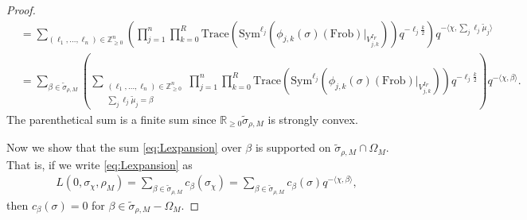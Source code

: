 \documentclass[10pt]{amsart}
\theoremstyle{definition}
\numberwithin{equation}{section}
\DeclareMathOperator{\Hom}{\mathrm{Hom}}
\numberwithin{equation}{subsection}
\newcommand{\ZZ}{\mathbb{Z}}
\newcommand{\RR}{\mathbb{R}}
\newcommand{\CC}{\mathbb{C}}
\begin{document}
\begin{proof}
\begin{align}
    \nonumber &=\sum_{(\ell_1,\ldots,\ell_n)\in\mathbb{Z}_{\geq 0}^n}\left(\prod_{j=1}^n\prod_{k=0}^R \mathrm{Trace}\left(\mathrm{Sym}^{\ell_j}\left(\phi_{j,k}(\sigma)(\mathrm{Frob})\big|_{V_{j,k}^{I_F}}\right)\right)q^{-\ell_j\frac{k}{2}}\right)q^{- \langle\chi,\sum_j\ell_j\widetilde{\mu}_j\rangle}\\
    &=\sum_{\beta\in \widetilde{\sigma}_{\rho,M}} \left(\sum_{\substack{(\ell_1,\ldots,\ell_n)\in\mathbb{Z}_{\geq 0}^n\\
    \sum_j\ell_j\widetilde{\mu}_j = \beta}} \prod_{j=1}^n\prod_{k=0}^R  \mathrm{Trace}\left(\mathrm{Sym}^{\ell_j}\left(\phi_{j,k}(\sigma)(\mathrm{Frob})\big|_{V_{j,k}^{I_F}}\right)\right)q^{-\ell_j\frac{k}{2}}\right) q^{-\langle\chi,\beta\rangle}.
\end{align}
The parenthetical sum is a finite sum since $\RR_{\ge 0}\widetilde{\sigma}_{\rho,M}$ is strongly convex. 

Now we show that the sum \eqref{eq:Lexpansion} over $\beta$ is supported on $\widetilde{\sigma}_{\rho,M}\cap \Omega_M$. That is, if we write \eqref{eq:Lexpansion} as
\begin{align*}
    L(0,\sigma_\chi,\rho_M) = \sum_{\beta\in\widetilde{\sigma}_{\rho,M}} c_\beta(\sigma_\chi) =\sum_{\beta\in\widetilde{\sigma}_{\rho,M}} c_\beta(\sigma)  q^{-\langle\chi,\beta\rangle},
\end{align*} 
then $c_\beta(\sigma) = 0$ for $\beta\in \widetilde{\sigma}_{\rho,M} - \Omega_M$. 




\end{proof}
\end{document}
